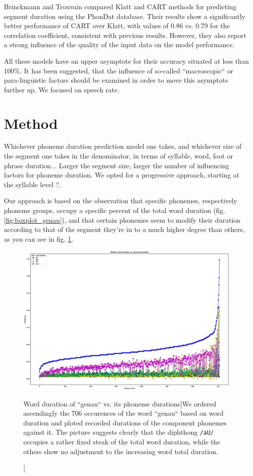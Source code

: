 \documentclass[a4paper]{scrreprt}
\begin{document}
Brinckmann and Trouvain \cite{Brinckmann_2003} compared Klatt and CART methods for predicting segment duration using the PhonDat database. Their results show a significantly better performance of CART over Klatt, with values of 0.86 vs. 0.79 for the correlation coefficient, consistent with previous results. However, they also report a strong influence of  the quality of the input data on the model performance.

All these models have an upper asymptote for their accuracy situated at less than 100\%. It has been suggested, that the influence of so-called ``macroscopic`` \cite{Cummins1999} or para-linguistic \cite{Santen1994} factors should be examined in order to move this asymptote further up. We focused on speech rate. 

\section{Method}
Whichever phoneme duration prediction model one takes, and whichever size of the segment one takes in the denominator, in terms of syllable, word, foot or phrase duration... Larger the segment size, larger the number of influencing factors for phoneme duration. We opted for a progressive approach, starting at the syllable level ?.

Our approach is based on the observation that specific phonemes, respectively phoneme groups, occupy a specific percent of the total word duration (fig. \ref{fig:boxplot_genau}), and that certain phonemes seem to modify their duration according to that of the segment they're in to a much higher degree than others, as you can see in fig. \ref{fig:w_dur_vs_pho}.

\begin{figure}[htbp]
	\includegraphics[width=\textwidth]{../Graphen/Stats_for_genau.eps}
	\centering
	\caption[Word duration of ``genau`` vs. its phoneme durations]{We ordered ascendingly the 706 occurences of the word ``genau`` based on word duration and ploted recorded durations of the component phonemes against it. The picture suggests clearly that the diphthong \texttt{/aU/} occupies a rather fixed steak of the total word duration, while the others show no adjustment to the increasing word total duration. }
	\label{fig:w_dur_vs_pho}
\end{figure}
\end{document}
